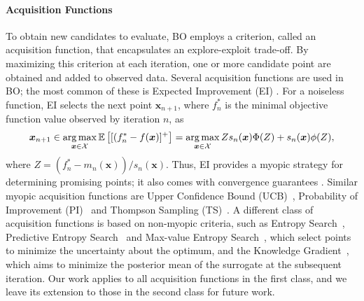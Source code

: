 \documentclass{article}
\newcommand{\frank}[1]{\todo[color=yellow]{Frank: #1}} %
\newcommand{\carl}[1]{{\todo[color=purple]{Carl: #1}}}
\begin{document}
\paragraph{Acquisition Functions} 
To obtain new candidates to evaluate, BO employs a criterion, called an acquisition function, that encapsulates an explore-exploit trade-off. By maximizing this criterion at each iteration, one or more candidate point are obtained and added to observed data. Several acquisition functions are used in BO; the most common of these is Expected Improvement (EI) \citep{jonesei}. For a noiseless function, EI selects the next point $\bm{x}_{n+1}$, where $f^*_n$ is the minimal objective function value observed by iteration $n$, as
\begin{equation}
    \bm{x}_{n+1} \in \mathop{\mathrm{arg\,max}}_{\bm{x}\in\mathcal{X}} \mathbb{E}\left[[(f^*_n - f(\bm{x})]^+\right] = \mathop{\mathrm{arg\,max}}_{\bm{x}\in\mathcal{X}} Zs_n(\bm{x})\Phi(Z) + s_n(\bm{x})\phi(Z),
\end{equation} \label{eq:ei}
\noindent{} where $Z = (f_n^* - m_n(\bm{x}))/s_n(\bm{x})$. Thus, EI provides a myopic strategy for determining promising points; it also comes with convergence guarantees \citep{JMLR:v12:bull11a}. Similar myopic acquisition functions are Upper Confidence Bound (UCB)~\citep{Srinivas_2012}, Probability of Improvement (PI)~\citep{jones2001taxonomy,pi} and Thompson Sampling (TS)~\citep{thompson1933likelihood}.
A different class of acquisition functions is based on non-myopic criteria, such as Entropy Search~\citep{entropysearch}, Predictive Entropy Search~\citep{pes} and Max-value Entropy Search~\citep{wang2018maxvalue}, which select points to minimize the uncertainty about the optimum, and the Knowledge Gradient~\citep{kg}, which aims to minimize the posterior mean of the surrogate at the subsequent iteration. Our work applies to all acquisition functions in the first class, and we leave its extension to those in the second class
for future work. 
\end{document}

